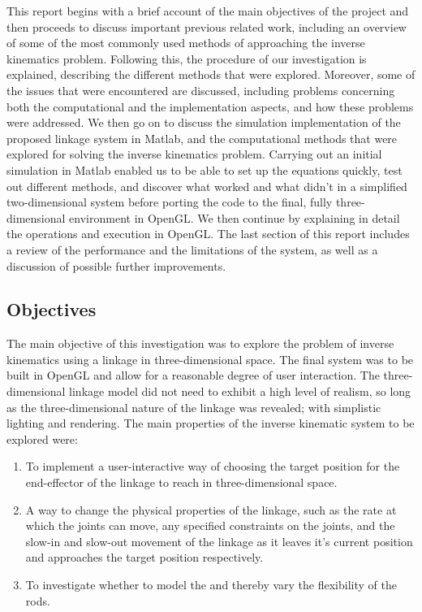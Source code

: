 \documentclass[paper=a4, fontsize=11pt]{scrartcl} %
\numberwithin{equation}{section} %
\numberwithin{figure}{section} %
\numberwithin{table}{section} %
\begin{document}
This report begins with a brief account of the main objectives of the project and then proceeds to discuss important previous related work, including an overview of some of the most commonly used methods of approaching the inverse kinematics problem. Following this, the procedure of our investigation is explained, describing the different methods that were explored. Moreover, some of the issues that were encountered are discussed, including problems concerning both the computational and the implementation aspects, and how these problems were addressed. We then go on to discuss the simulation implementation of the proposed linkage system in Matlab, and the computational methods that were explored for solving the inverse kinematics problem. Carrying out an initial simulation in Matlab enabled us to be able to set up the equations quickly, test out different methods, and discover what worked and what didn't in a simplified two-dimensional system before porting the code to the final, fully three-dimensional environment in OpenGL. We then continue by explaining in detail the operations and execution in OpenGL. The last section of this report includes a review of the performance and the limitations of the system, as well as a discussion of possible further improvements.

\subsection{Objectives}

The main objective of this investigation was to explore the problem of inverse kinematics using a linkage in three-dimensional space. The final system was to be built in OpenGL and allow for a reasonable degree of user interaction. The three-dimensional linkage model did not need to exhibit a high level of realism, so long as the three-dimensional nature of the linkage was revealed; with simplistic lighting and rendering. The main properties of the inverse kinematic system to be explored were:

\begin{enumerate}
\item
To implement a user-interactive way of choosing the target position for the end-effector of the linkage to reach in three-dimensional space.

\item
A way to change the physical properties of the linkage, such as the rate at which the joints can move, any specified constraints on the joints, and the slow-in and slow-out movement of the linkage as it leaves it's current position and approaches the target position respectively.

\item
To investigate whether to model the and thereby vary the flexibility of the rods.
\end{enumerate} 
\end{document}
